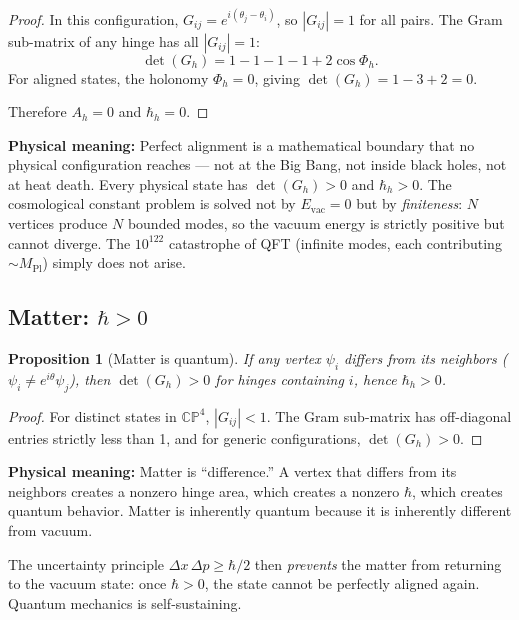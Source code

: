 \documentclass[12pt]{article}
\newtheorem{proposition}[theorem]{Proposition}
\theoremstyle{remark}
\theoremstyle{definition}
\begin{document}
\begin{proof}
In this configuration, $G_{ij} = e^{i(\theta_j - \theta_i)}$, so $|G_{ij}| = 1$ for all pairs. The Gram sub-matrix of any hinge has all $|G_{ij}| = 1$:
\begin{equation}
\det(G_h) = 1 - 1 - 1 - 1 + 2\cos\Phi_h.
\end{equation}
For aligned states, the holonomy $\Phi_h = 0$, giving $\det(G_h) = 1 - 3 + 2 = 0$.

Therefore $A_h = 0$ and $\hbar_h = 0$.
\end{proof}

\textbf{Physical meaning:} Perfect alignment is a mathematical boundary that no physical configuration reaches --- not at the Big Bang, not inside black holes, not at heat death. Every physical state has $\det(G_h) > 0$ and $\hbar_h > 0$. The cosmological constant problem is solved not by $E_\text{vac} = 0$ but by \emph{finiteness}: $N$ vertices produce $N$ bounded modes, so the vacuum energy is strictly positive but cannot diverge. The $10^{122}$ catastrophe of QFT (infinite modes, each contributing $\sim M_\text{Pl}$) simply does not arise.

\subsection{Matter: $\hbar > 0$}

\begin{proposition}[Matter is quantum]
If any vertex $\psi_i$ differs from its neighbors ($\psi_i \neq e^{i\theta}\psi_j$), then $\det(G_h) > 0$ for hinges containing $i$, hence $\hbar_h > 0$.
\end{proposition}

\begin{proof}
For distinct states in $\mathbb{CP}^4$, $|G_{ij}| < 1$. The Gram sub-matrix has off-diagonal entries strictly less than 1, and for generic configurations, $\det(G_h) > 0$.
\end{proof}

\textbf{Physical meaning:} Matter is ``difference.'' A vertex that differs from its neighbors creates a nonzero hinge area, which creates a nonzero $\hbar$, which creates quantum behavior. Matter is inherently quantum because it is inherently different from vacuum.

The uncertainty principle $\Delta x\,\Delta p \geq \hbar/2$ then \emph{prevents} the matter from returning to the vacuum state: once $\hbar > 0$, the state cannot be perfectly aligned again. Quantum mechanics is self-sustaining.
\end{document}
